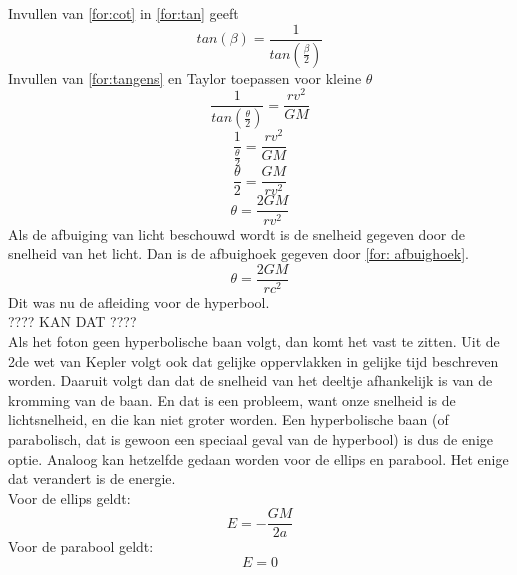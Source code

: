 Invullen van \cref{for:cot} in \cref{for:tan} geeft
\begin{equation}
    tan(\beta) = \frac{1}{tan(\frac{\beta}{2})}
    \label{for:afbuighoek}
\end{equation}
Invullen van \cref{for:tangens} en Taylor toepassen voor kleine $\theta$
$$\frac{1}{tan(\frac{\theta}{2})} = \frac{rv^{2}}{GM}$$
$$\frac{1}{\frac{\theta}{2}}=\frac{rv^{2}}{GM}$$
$$\frac{\theta}{2} = \frac{GM}{rv^{2}}$$
$$\theta = \frac{2GM}{rv^{2}}$$
Als de afbuiging van licht beschouwd wordt is de snelheid gegeven door de snelheid van het licht. Dan is de afbuighoek gegeven door \cref{for: afbuighoek}.
\begin{equation}
    \theta = \frac{2GM}{rc^{2}}
    \label{for: afbuighoek}
\end{equation}
Dit was nu de afleiding voor de hyperbool. 
\\ ???? KAN DAT ???? \\
Als het foton geen hyperbolische baan volgt, dan komt het vast te zitten. Uit de 2de wet van Kepler volgt ook dat gelijke oppervlakken in gelijke tijd beschreven worden. Daaruit volgt dan dat de snelheid van het deeltje afhankelijk is van de kromming van de baan. En dat is een probleem, want onze snelheid is de lichtsnelheid, en die kan niet groter worden. Een hyperbolische baan (of parabolisch, dat is gewoon een speciaal geval van de hyperbool) is dus de enige optie.
Analoog kan hetzelfde gedaan worden voor de ellips en parabool. Het enige dat verandert is de energie.\\
Voor de ellips geldt:
$$E=-\frac{GM}{2a}$$
Voor de parabool geldt:
$$E=0$$


